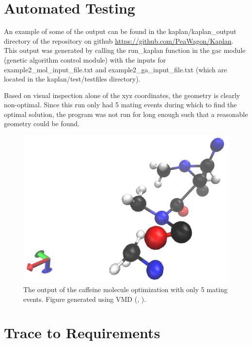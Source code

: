 \documentclass[12pt, titlepage]{article}
\begin{document}
\section{Automated Testing}

An example of some of the output can be found in the kaplan/kaplan\_output 
directory of the repository on github \url{https://github.com/PeaWagon/Kaplan}. 
This output was generated by calling the run\_kaplan function in the gac module 
(genetic algorithm control module) with the inputs for 
example2\_mol\_input\_file.txt and example2\_ga\_input\_file.txt (which are 
located in the kaplan/test/testfiles directory).

Based on visual inspection alone of the xyz coordinates, the geometry is 
clearly non-optimal. Since this run only had 5 mating events during which to 
find the optimal solution, the program was not run for long enough such that a 
reasonable geometry could be found.

\begin{figure}
	\includegraphics[width=\textwidth]{conf1-caffeine}
	\caption{The output of the caffeine molecule optimization with only 5 
	mating events. Figure generated using VMD (\citet{vmd}, \citet{vmd-pics}).}
\label{vmd-figure}
\end{figure}
		
\section{Trace to Requirements}	
\end{document}
